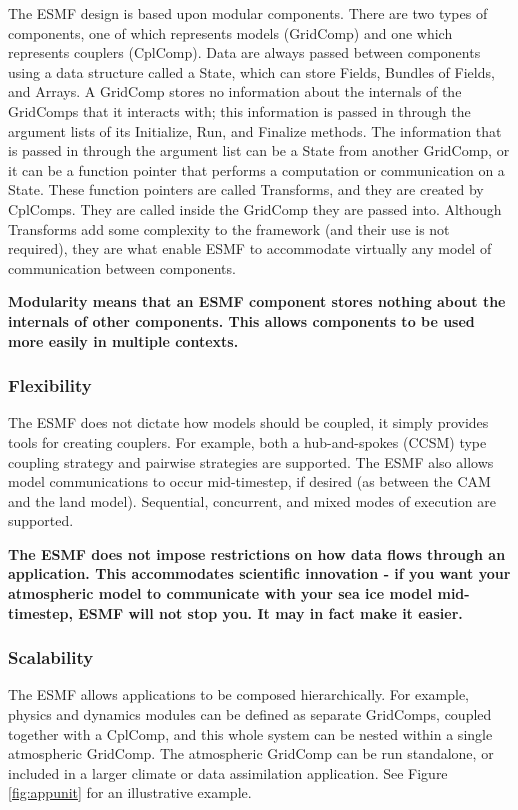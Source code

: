 The ESMF design is based upon modular components.  There
are two types of components, one of which represents models 
(GridComp) and one which represents couplers (CplComp).  Data
are always passed between components using a data structure 
called a State, which can store Fields, Bundles of Fields,
and Arrays.  A GridComp stores no information about the internals 
of the GridComps that it interacts with; this information is 
passed in through the argument lists of its Initialize, Run, 
and Finalize methods.  The information that is 
passed in through the argument list can be a State from 
another GridComp, or it can be a function pointer that performs
a computation or communication on a State.  These function 
pointers are called Transforms, and they are created by 
CplComps.  They are called inside the GridComp they are passed 
into.  Although Transforms add some complexity to the framework 
(and their use is not required), they are what enable ESMF to 
accommodate virtually any model of communication between components. 

{\bf Modularity means that an ESMF component stores nothing about 
the internals of other components.  This allows components to be 
used more easily in multiple contexts.}

\subsubsection{Flexibility}
The ESMF does not dictate how models should be coupled, it
simply provides tools for creating couplers.  For example, 
both a hub-and-spokes (CCSM) type coupling strategy and  
pairwise strategies are supported.  The ESMF also allows model
communications to occur mid-timestep, if desired (as between
the CAM and the land model).  Sequential, concurrent, and mixed
modes of execution are supported.  

{\bf The ESMF does not impose restrictions on how data flows through 
an application.  This accommodates scientific innovation - if you 
want your atmospheric model to communicate with your sea ice model
mid-timestep, ESMF will not stop you.  It may in fact make
it easier.}

\subsubsection{Scalability}
The ESMF allows applications to be composed hierarchically.
For example, physics and dynamics modules can be defined as 
separate GridComps, coupled together with a CplComp, and this 
whole system can be nested within a single atmospheric GridComp.
The atmospheric GridComp can be run standalone, or included
in a larger climate or data assimilation application.  See Figure
\ref{fig:appunit} for an illustrative example.

